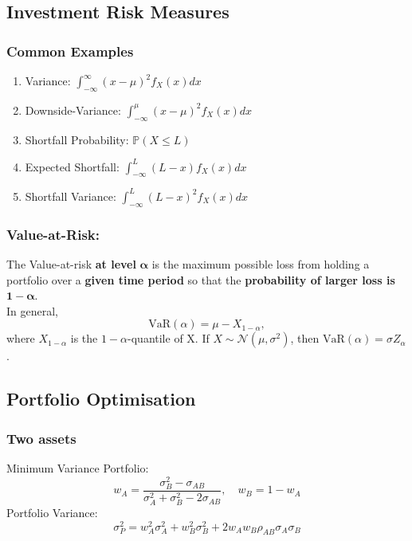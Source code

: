 \documentclass[11pt]{article}
\newcommand{\PR}{\mathbb{P}}
\begin{document}
	\subsection{Investment Risk Measures}
	\subsubsection{Common Examples}
	\begin{enumerate}
		\item Variance: \( \int_{-\infty}^{\infty} (x - \mu)^2 f_{X}(x)dx \)
		\item Downside-Variance: \( \int_{-\infty}^{\mu} (x - \mu)^2 f_{X}(x)dx \)
		\item Shortfall Probability: \( \PR(X \leq L ) \)
		\item Expected Shortfall: \( \int_{-\infty}^{L}(L-x)f_{X}(x)dx \)
		\item Shortfall Variance: \( \int_{-\infty}^{L}(L-x)^2  f_{X}(x)dx \)
	\end{enumerate}
	\subsubsection{Value-at-Risk:}
	The Value-at-risk \textbf{at level }\( \bm{\alpha} \) is the maximum possible loss from holding a portfolio over a \textbf{given time period} so that the \textbf{probability of larger loss is} \(\bm{1 - \alpha}  \).\\
	In general, 
	\[	\text{VaR}(\alpha) = \mu - X_{1 - \alpha},
		\]
	where \( X_{1-\alpha} \) is the \( 1 - \alpha \)-quantile of X.
	If \( X\sim\mathcal{N}(\mu, \sigma^2) \), then 
	\(	\text{VaR}(\alpha) = \sigma Z_{\alpha}
		\).
	\subsection{Portfolio Optimisation}
	\subsubsection{Two assets}
	Minimum Variance Portfolio: \[	w_A = \frac{\sigma^2_B - \sigma_{AB}}{\sigma^2_A + \sigma^2_B - 2\sigma_{AB}},\quad w_B = 1 - w_A\]
	Portfolio Variance:
	\[	\sigma_P^2 = w_A^2 \sigma_A^2 + w_B^2 \sigma_B^2 + 2w_A w_B\rho_{AB}\sigma_{A}\sigma_B\]
	
\end{document}
